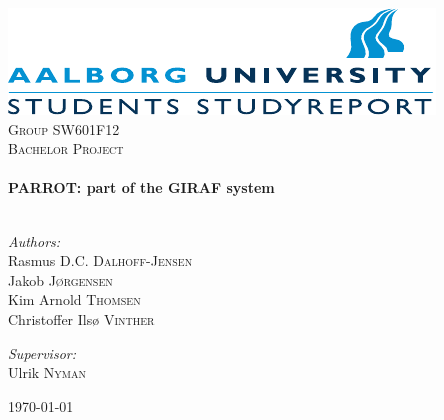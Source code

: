 \begin{nopagebreak}

\begin{center}

\includegraphics[width=\textwidth]{input/Images/aau_logo_en.pdf}\\[1cm]    

\textsc{\LARGE Group SW601F12}\\[1.5cm]

\textsc{\Large Bachelor Project}\\[0.5cm]


\HRule \\[0.4cm]
{ \huge \bfseries PARROT: part of the GIRAF system}\\[0.4cm]

\HRule \\[1.5cm]

\begin{minipage}{0.4\textwidth}
\begin{flushleft} \large
\vspace{1.25cm}
\emph{Authors:}\\
Rasmus D.C. \textsc{Dalhoff-Jensen} \\
Jakob \textsc{J\o{}rgensen} \\
Kim Arnold \textsc{Thomsen}\\
Christoffer Ils\o{} \textsc{Vinther}

\end{flushleft}
\end{minipage}
\begin{minipage}{0.4\textwidth}
\begin{flushright} \large
\emph{Supervisor:} \\
Ulrik \textsc{Nyman}
\end{flushright}
\end{minipage}

\vfill

{\large \today}

\end{center}

\end{nopagebreak}
